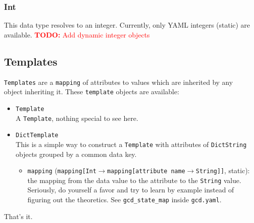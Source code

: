 \documentclass[11pt]{article}
\newcommand{\todo}[1]{\textcolor{red}{\textbf{TODO:} #1}}
\begin{document}
\subsubsection {Int}
This data type resolves to an integer. Currently, only YAML integers (static) are available.
\todo{Add dynamic integer objects}

\subsection {Templates}
\texttt{Templates} are a \texttt{mapping} of attributes to values which are inherited by any object inheriting it. These \texttt{template} objects are available:
\begin{itemize}
  \item \texttt{Template} \\
  A \texttt{Template}, nothing special to see here.
  \item \texttt{DictTemplate} \\
  This is a simple way to construct a \texttt{Template} with attributes of \texttt{DictString} objects grouped by a common data key.
  \begin{itemize}
    \item \texttt{mapping} (\texttt{mapping[Int$\rightarrow$mapping[attribute name$\rightarrow$String]]}, static): the mapping from the data value to the attribute to the \texttt{String} value. Seriously, do yourself a favor and try to learn by example instead of figuring out the theoretics. See \texttt{gcd\_state\_map} inside \texttt{gcd.yaml}.
  \end{itemize}
\end{itemize}

That's it.
\end{document}
